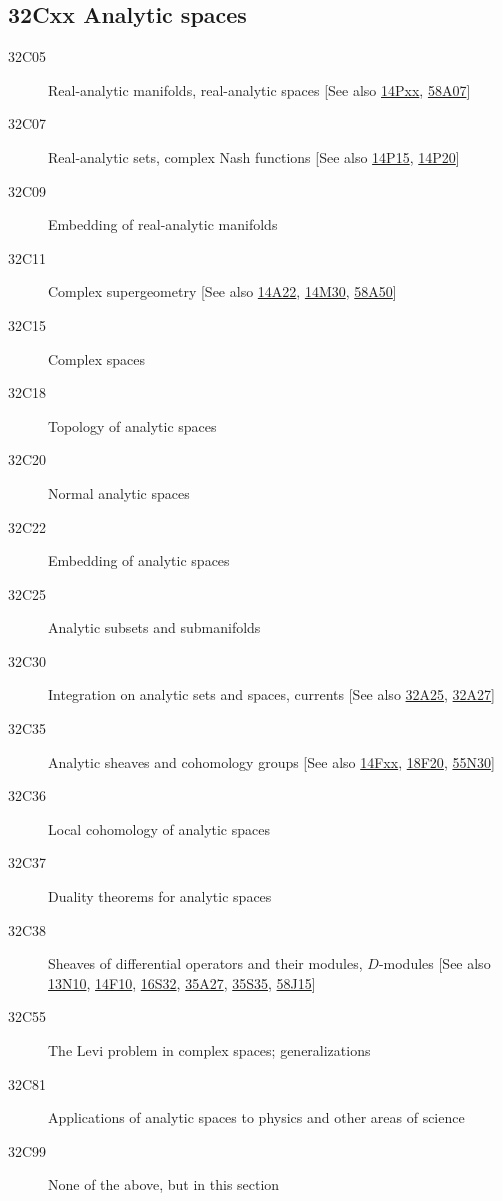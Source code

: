 \subsection*{32Cxx  Analytic spaces }\label{32Cxx}
\begin{description}  
\item [32C05]\label{32C05} Real-analytic manifolds, real-analytic spaces [See also \hyperref[14Pxx]{14Pxx}, \hyperref[58A07]{58A07}]
\item [32C07]\label{32C07} Real-analytic sets, complex Nash functions [See also \hyperref[14P15]{14P15}, \hyperref[14P20]{14P20}]
\item [32C09]\label{32C09} Embedding of real-analytic manifolds
\item [32C11]\label{32C11} Complex supergeometry [See also \hyperref[14A22]{14A22}, \hyperref[14M30]{14M30}, \hyperref[58A50]{58A50}]
\item [32C15]\label{32C15} Complex spaces
\item [32C18]\label{32C18} Topology of analytic spaces
\item [32C20]\label{32C20} Normal analytic spaces
\item [32C22]\label{32C22} Embedding of analytic spaces
\item [32C25]\label{32C25} Analytic subsets and submanifolds
\item [32C30]\label{32C30} Integration on analytic sets and spaces, currents [See also \hyperref[32A25]{32A25}, \hyperref[32A27]{32A27}]
\item [32C35]\label{32C35} Analytic sheaves and cohomology groups [See also \hyperref[14Fxx]{14Fxx}, \hyperref[18F20]{18F20}, \hyperref[55N30]{55N30}]
\item [32C36]\label{32C36} Local cohomology of analytic spaces
\item [32C37]\label{32C37} Duality theorems for analytic spaces
\item [32C38]\label{32C38} Sheaves of differential operators and their modules, $D$-modules [See also \hyperref[13N10]{13N10}, \hyperref[14F10]{14F10}, \hyperref[16S32]{16S32}, \hyperref[35A27]{35A27}, \hyperref[35S35]{35S35}, \hyperref[58J15]{58J15}]
\item [32C55]\label{32C55} The Levi problem in complex spaces; generalizations
\item [32C81]\label{32C81} Applications of analytic spaces to physics and other areas of science
\item [32C99]\label{32C99} None of the above, but in this section
\end{description}
